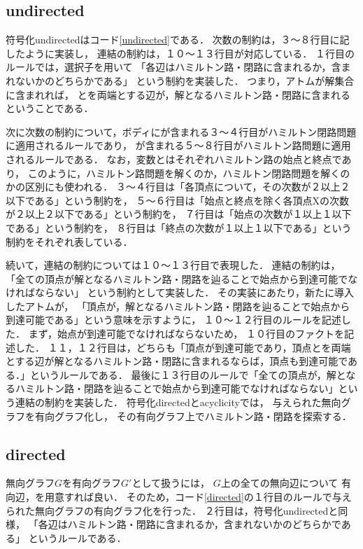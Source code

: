 \subsection{undirected}


符号化undirectedはコード\ref{undirected}である．
次数の制約は，３〜８行目に記したように実装し，
連結の制約は，１０〜１３行目が対応している．
１行目のルールでは，選択子を用いて
「各辺はハミルトン路・閉路に含まれるか，含まれないかのどちらかである」
という制約を実装した．
つまり，アトムが解集合に含まれれば，
とを両端とする辺が，解となるハミルトン路・閉路に含まれるということである．

次に次数の制約について，ボディにが含まれる３〜４行目がハミルトン閉路問題に適用されるルールであり，
が含まれる５〜８行目がハミルトン路問題に適用されるルールである．
なお，変数とはそれぞれハミルトン路の始点と終点であり，
このように，ハミルトン路問題を解くのか，ハミルトン閉路問題を解くのかの区別にも使われる．
３〜４行目は「各頂点について，その次数が２以上２以下である」という制約を，
５〜６行目は「始点と終点を除く各頂点Xの次数が２以上２以下である」という制約を，
７行目は「始点の次数が１以上１以下である」という制約を，
８行目は「終点の次数が１以上１以下である」という制約をそれぞれ表している．

続いて，連結の制約については１０〜１３行目で表現した．
連結の制約は，
「全ての頂点が解となるハミルトン路・閉路を辿ることで始点から到達可能でなければならない」
という制約として実装した．
その実装にあたり，新たに導入したアトムが，
「頂点が，解となるハミルトン路・閉路を辿ることで始点から到達可能である」という意味を示すように，
１０〜１２行目のルールを記述した．
まず，始点が到達可能でなければならないため，
１０行目のファクトを記述した．
１１，１２行目は，どちらも「頂点が到達可能であり，頂点とを両端とする辺が解となるハミルトン路・閉路に含まれるならば，頂点も到達可能である．」というルールである．
最後に１３行目のルールで「全ての頂点が，解となるハミルトン路・閉路を辿ることで始点から到達可能でなければならない」という連結の制約を実装した．
\newpage
符号化directedとacyclicityでは，
与えられた無向グラフを有向グラフ化し，
その有向グラフ上でハミルトン路・閉路を探索する．
\subsection{directed}

無向グラフ$G$を有向グラフ$G'$として扱うには，
$G$上の全ての無向辺について
有向辺，を用意すれば良い．
そのため，コード\ref{directed}の１行目のルールで与えられた無向グラフの有向グラフ化を行った．
２行目は，符号化undirectedと同様，
「各辺はハミルトン路・閉路に含まれるか，含まれないかのどちらかである」
というルールである．

